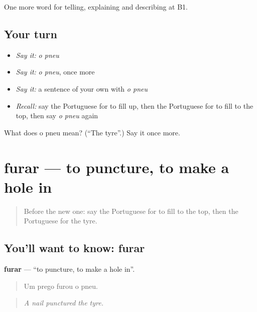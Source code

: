 \begin{grammarlens}[title={What you've built}]
One more word for telling, explaining and describing at B1.
\end{grammarlens}

\subsection*{Your turn}
\begin{itemize}
\raggedright
  \item \emph{Say it:} \emph{o pneu}
  \item \emph{Say it:} \emph{o pneu}, once more
  \item \emph{Say it:} a sentence of your own with \emph{o pneu}
  \item \emph{Recall:} say the Portuguese for to fill up, then the Portuguese for to fill to the top, then say \emph{o pneu} again
\end{itemize}

\begin{tcolorbox}[breakable,colback=teal!4,colframe=teal!35!black,title={Before you move on}]
What does o pneu mean? (\textquotedblleft{}The tyre\textquotedblright{}.) Say it once more.
\end{tcolorbox}
\section[furar]{furar — to puncture, to make a hole in}

\label{lesson:PT-C405-furar}



\begin{quote}
Before the new one: say the Portuguese for to fill to the top, then the Portuguese for the tyre.
\end{quote}

\subsection*{You'll want to know: furar}
\textbf{furar} — \textquotedblleft{}to puncture, to make a hole in\textquotedblright{}.

\begin{quote}
Um prego furou o pneu.
\end{quote}

\begin{quote}
\emph{A nail punctured the tyre.}
\end{quote}

